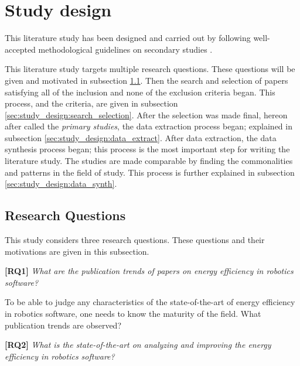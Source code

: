 \section{Study design}
\label{sec:study_design}
This literature study has been designed and carried out by following 
well-accepted methodological guidelines on secondary studies
\cite{petersen2015guidelines_systematic, kitchenham2013systematic_review_guidelines, wohlin2012experimentation}.

This literature study targets multiple research questions. 
These questions will be given and motivated in subsection \ref{sec:study_design:research_questions}.
Then the search and selection of papers satisfying all of the inclusion and none of the exclusion criteria began.
This process, and the criteria, are given in subsection \ref{sec:study_design:search_selection}.
After the selection was made final, hereon after called the \textit{primary studies}, 
the data extraction process began; explained in subsection \ref{sec:study_design:data_extract}. 
After data extraction, the data synthesis process began; this process is the most important step for writing the literature study. 
The studies are made comparable by finding the commonalities and patterns in the field of study. 
This process is further explained in subsection \ref{sec:study_design:data_synth}.


\subsection{Research Questions}
\label{sec:study_design:research_questions}
This study considers three research questions. These questions and their motivations are given in this subsection.

\vspace{5mm}

\textbf{[RQ1]} \textit{What are the publication trends of papers on energy efficiency in robotics software?}

\vspace{5mm}

To be able to judge any characteristics of the state-of-the-art of energy efficiency in robotics software, one needs to know the maturity of the field.
What publication trends are observed?

\vspace{5mm}

\textbf{[RQ2]} \textit{What is the state-of-the-art on analyzing and improving the energy efficiency in robotics software?}

